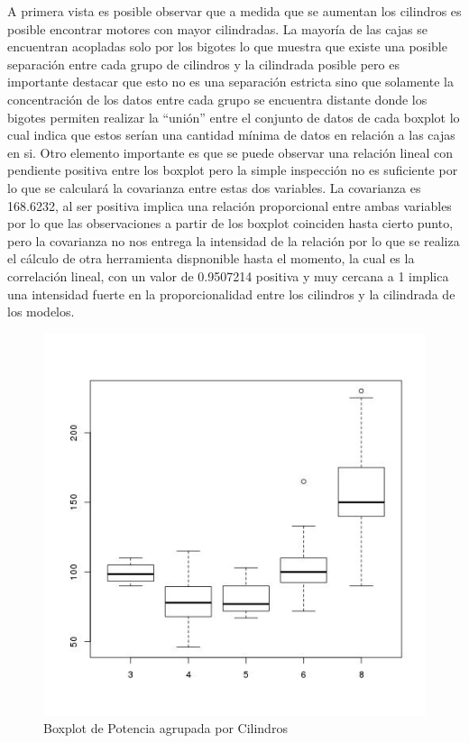 \documentclass[letter,10pt]{article}
\begin{document}
A primera vista es posible observar que a medida que se aumentan los cilindros es posible
encontrar motores con mayor cilindradas. La mayoría de las cajas se encuentran acopladas solo por los bigotes lo que muestra
que existe una posible separación entre cada grupo de cilindros y la cilindrada posible pero es importante destacar que esto
no es una separación estricta sino que solamente la concentración de los datos entre cada grupo se encuentra distante donde los bigotes
permiten realizar la ``unión'' entre el conjunto de datos de cada boxplot lo cual indica que estos serían una cantidad mínima
de datos en relación a las cajas en si.
Otro elemento importante es que se puede observar una relación lineal con pendiente positiva entre los boxplot pero
la simple inspección no es suficiente por lo que se calculará la covarianza entre estas dos variables. La covarianza es
168.6232, al ser positiva implica una relación proporcional entre ambas variables por lo que las observaciones a partir
de los boxplot coinciden hasta cierto punto, pero la covarianza no nos entrega la intensidad de la relación por lo que se realiza
el cálculo de otra herramienta dispnonible hasta el momento, la cual es la correlación lineal, con un valor de 0.9507214
positiva y muy cercana a 1 implica una intensidad fuerte en la proporcionalidad entre los cilindros y la cilindrada de los modelos.
\begin{figure}[h!]
    \centering
    \includegraphics[scale=0.4]{boxplot_horsepower_cylinders.jpg}
    \caption{Boxplot de Potencia agrupada por Cilindros}
    \label{fig:boxplot_horsepower_cylinders}
\end{figure}
\end{document}

